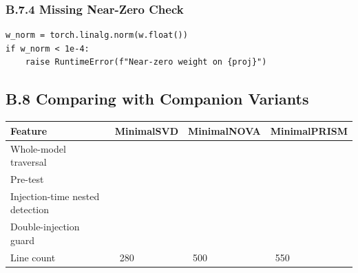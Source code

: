 \subsubsection{B.7.4 Missing Near-Zero Check}

\begin{lstlisting}
w_norm = torch.linalg.norm(w.float())
if w_norm < 1e-4:
    raise RuntimeError(f"Near-zero weight on {proj}")
\end{lstlisting}

\subsection{B.8 Comparing with Companion Variants}

\begin{table}[H]
\centering
\small
\begin{tabular}{llll}
\toprule
\textbf{Feature} & \textbf{MinimalSVD} & \textbf{MinimalNOVA} & \textbf{MinimalPRISM} \\
\midrule
Whole-model traversal &  &  &  \\
Pre-test &  &  &  \\
Injection-time nested detection &  &  &  \\
Double-injection guard &  &  &  \\
Line count & ~280 & ~500 & ~550 \\
\bottomrule
\end{tabular}
\end{table}

